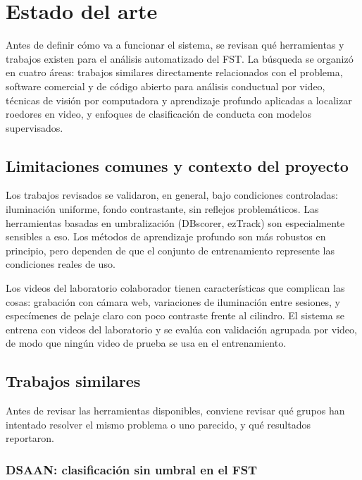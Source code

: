 \chapter{Estado del arte}

Antes de definir cómo va a funcionar el sistema, se revisan qué herramientas y trabajos
existen para el análisis automatizado del FST. La búsqueda se organizó en cuatro áreas:
trabajos similares directamente relacionados con el problema, software comercial y de
código abierto para análisis conductual por video, técnicas de visión por computadora y
aprendizaje profundo aplicadas a localizar roedores en video, y enfoques de clasificación
de conducta con modelos supervisados.

\section{Limitaciones comunes y contexto del proyecto}

Los trabajos revisados se validaron, en general, bajo condiciones controladas: iluminación
uniforme, fondo contrastante, sin reflejos problemáticos. Las herramientas basadas en
umbralización (DBscorer, ezTrack) son especialmente sensibles a eso. Los métodos de
aprendizaje profundo son más robustos en principio, pero dependen de que el conjunto
de entrenamiento represente las condiciones reales de uso.

Los videos del laboratorio colaborador tienen características que complican las cosas:
grabación con cámara web, variaciones de iluminación entre sesiones, y
especímenes de pelaje claro con poco contraste frente al cilindro. El sistema se entrena
con videos del laboratorio y se evalúa con validación agrupada por video, de modo que ningún video de prueba se usa
en el entrenamiento.

\section{Trabajos similares}

Antes de revisar las herramientas disponibles, conviene revisar qué grupos han
intentado resolver el mismo problema o uno parecido, y qué resultados reportaron.

\subsection{DSAAN: clasificación sin umbral en el FST}

